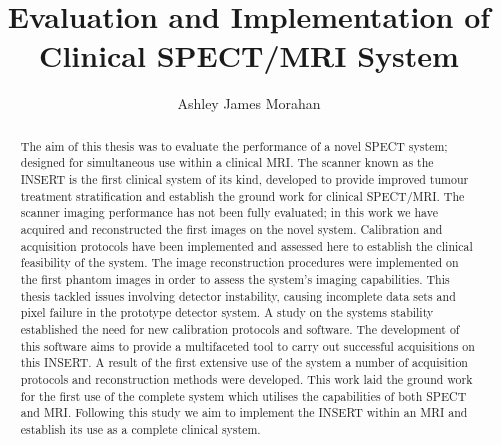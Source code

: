 
\title{Evaluation and Implementation of Clinical SPECT/MRI System}
\author{Ashley James Morahan}

\maketitle
\makedeclaration

\begin{abstract} %
The aim of this thesis was to evaluate the performance of a novel \acrshort{SPECT} system; designed for simultaneous use within a clinical \acrshort{MRI}. The scanner known as the \acrshort{INSERT} is the first clinical system of its kind, developed to provide improved tumour treatment stratification and establish the ground work for clinical \acrshort{SPECT/MRI}. The scanner imaging performance has not been fully evaluated; in this work we have acquired and reconstructed the first images on the novel system. Calibration and acquisition protocols have been implemented and assessed here to establish the clinical feasibility of the system. The image reconstruction procedures were implemented on the first phantom images in order to assess the system's imaging capabilities. This thesis tackled issues involving detector instability, causing incomplete data sets and pixel failure in the prototype detector system. A study on the systems stability established the need for new calibration protocols and software. The development of this software aims to provide a multifaceted tool to carry out successful acquisitions on this \acrshort{INSERT}. A result of the first extensive use of the system a number of acquisition protocols and reconstruction methods were developed.  This work laid the ground work for the first use of the complete system which utilises the capabilities of both \acrshort{SPECT} and \acrshort{MRI}. Following this study we aim to implement the \acrshort{INSERT} within an \acrshort{MRI} and establish its use as a complete clinical system. 
\end{abstract}

